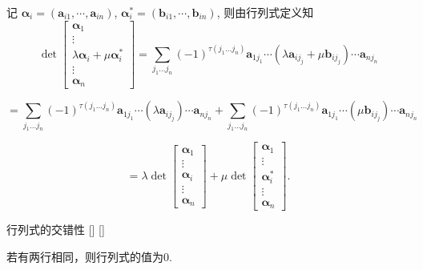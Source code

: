\documentclass[UTF8]{ctexart}
\begin{document}
        \begin{prf}
        \begin{enumerate}
        记 $\boldsymbol{\alpha}_i = (\boldsymbol{a}_{i1}, \cdots, \boldsymbol{a}_{in})$, $\boldsymbol{\alpha}_i^* = (\boldsymbol{b}_{i1}, \cdots, \boldsymbol{b}_{in})$, 则由行列式定义知
        \[
        \det \begin{bmatrix}
        \boldsymbol{\alpha}_1 \\
        \vdots \\
        \lambda \boldsymbol{\alpha}_i + \mu \boldsymbol{\alpha}_i^* \\
        \vdots \\
        \boldsymbol{\alpha}_n
        \end{bmatrix}
        =
        \sum_{j_1 \ldots j_n} (-1)^{\tau(j_1 \ldots j_n)} \boldsymbol{a}_{1j_1} \cdots (\lambda \boldsymbol{a}_{ij_j} + \mu \boldsymbol{b}_{ij_j}) \cdots \boldsymbol{a}_{nj_n}
        \]

        \[= \sum_{j_1 \ldots j_n} (-1)^{\tau(j_1 \ldots j_n)} \boldsymbol{a}_{1j_1} \cdots (\lambda \boldsymbol{a}_{ij_j}) \cdots \boldsymbol{a}_{nj_n} + \sum_{j_1 \ldots j_n} (-1)^{\tau(j_1 \ldots j_n)} \boldsymbol{a}_{1j_1} \cdots (\mu \boldsymbol{b}_{ij_j}) \cdots \boldsymbol{a}_{nj_n}\]

        \[= \lambda \det \begin{bmatrix}
        \boldsymbol{\alpha}_1 \\
        \vdots \\
        \boldsymbol{\alpha}_i \\
        \vdots \\
        \boldsymbol{\alpha}_n
        \end{bmatrix}
        +
        \mu \det \begin{bmatrix}
            \boldsymbol{\alpha}_1 \\
            \vdots \\
            \boldsymbol{\alpha}_i^* \\
            \vdots \\
            \boldsymbol{\alpha}_n
        \end{bmatrix}.
        \]
        \end{enumerate}
        \end{prf}

    \begin{thm}
			[]
			{行列式的交错性}
			[]
			[]
        
        若有两行相同，则行列式的值为0.
    \end{thm}
\end{document}
